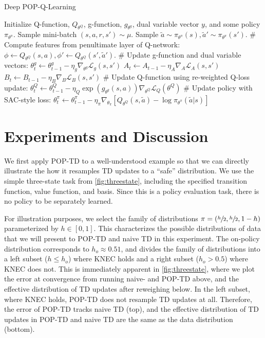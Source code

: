 \begin{algorithm}[tb]
  \caption{Deep POP-Q-Learning}
  \label{alg:example}
  \begin{algorithmic}
    \STATE  Initialize Q-function, $Q_{\theta^Q}$, g-function, $g_{\theta^g}$, dual variable vector $y$, and some policy $\pi_{\theta^\pi}$.
    \STATE Sample mini-batch $(s, a, r, s') \sim \mu$.
    \STATE Sample $\tilde{a} \sim \pi_{\theta^\pi}(s), \tilde{a}' \sim \pi_{\theta^\pi}(s')$.
    \STATE \# Compute features from penultimate layer of Q-network:
    \STATE $\phi \gets Q_{\theta^Q}(s, a), \phi' \gets Q_{\theta^Q}(s', \tilde{a}')$.
    \STATE \# Update g-function and dual variable vectors:
    \STATE $\theta^g_t \gets \theta^g_{t-1} - \eta_g \nabla_{\theta^g} \mathcal{L}_g(s, s')$
    \STATE $A_t \gets A_{t-1} - \eta_A \nabla_{A} \mathcal{L}_{A}(s, s')$
    \STATE $B_t \gets B_{t-1} - \eta_B \nabla_{B} \mathcal{L}_{B}(s, s')$
    \STATE \# Update Q-function using re-weighted Q-loss update:
    \STATE $\theta^Q_t \gets \theta^Q_{t-1} - \eta_Q \exp (g_{\theta^g}(s, a)) \nabla_{\theta^Q} \mathcal{L}_Q(\theta^Q)$
    \STATE \# Update policy with SAC-style loss:
    \STATE $\theta^\pi_t \gets \theta^\pi_{t-1} - \eta_\pi \nabla_{\theta_\pi} [Q_{\theta^Q}(s, \tilde{a}) - \log \pi_{\theta^\pi}(\tilde{a} | s)]$
    \ENDFOR
  \end{algorithmic}
\end{algorithm}

\section{Experiments and Discussion}

We first apply POP-TD to a well-understood example so that we can directly illustrate the how it resamples TD updates to a ``safe'' distribution. We use the simple three-state task from \cref{fig:threestate}, including the specified transition function, value function, and basis. Since this is a policy evaluation task, there is no policy to be separately learned.

For illustration purposes, we select the family of distributions $\pi = (\sfrac h 2, \sfrac h 2, 1- h)$ parameterized by $h \in [0, 1]$.
This characterizes the possible distributions of data that we will present to POP-TD and naive TD in this experiment. The on-policy distribution corresponds to $h_o\approx 0.51$, and divides the family of distributions into a left subset ($h \leq h_o$) where KNEC holds and a right subset ($h_o > 0.5$) where KNEC does not. This is immediately apparent in \cref{fig:threestate}, where we plot the error at convergence from running naive- and POP-TD above, and the effective distribution of TD updates after reweighing below.
In the left subset, where KNEC holds, POP-TD does not resample TD updates at all. Therefore, the error of POP-TD tracks naive TD (top), and the effective distribution of TD updates in POP-TD and naive TD are the same as the data distribution (bottom).

